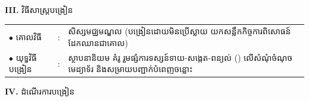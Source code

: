 \documentclass[a4paper,10pt]{article}
\begin{document}
{\vspace{1pt}

\textbf{III.} {\muol វិធីសាស្រ្តបង្រៀន}\\[1pt]
\hspace*{0.45cm}%
\begin{tabular}{@{}l l L{14.85cm}@{}}
  $\bullet$ \hspace{0.25cm} គោលវិធី & : & សិស្សមជ្ឈមណ្ឌល (បង្រៀនដោយមិនប្រើស្លាយ  យកសន្លឹកកិច្ចការពិសោធន៍ដែកឈានជាគោល) \\
  $\bullet$ \hspace{0.25cm} យុទ្ធវិធីបង្រៀន & : & ស្ថាបនានិយម គំរូ  រួមផ្សំការទស្សន៍ទាយ-សង្កេត-ពន្យល់ () លើសំណុំចំណុចមេដ្យាទ័រ និងសម្រាយបញ្ជាក់បំពេញចន្លោះ \\
\end{tabular}
}

\vspace{1pt}

\textbf{IV.} {\muol ដំណើរការបង្រៀន}

\vspace{1pt}
\end{document}
